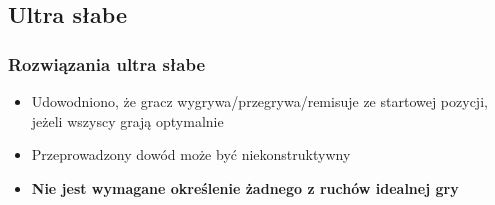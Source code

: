 \documentclass[polish,envcountsect,10pt]{beamer}
\begin{document}
        \subsection{Ultra słabe}
            \begin{frame}
                \frametitle{Rozwiązania ultra słabe}
                \begin{itemize}
                    \item<1-> Udowodniono, że gracz wygrywa/przegrywa/remisuje ze startowej pozycji, jeżeli wszyscy grają optymalnie
                    \item<2-> Przeprowadzony dowód może być niekonstruktywny
                    \item<3-> \textbf{Nie jest wymagane określenie żadnego z ruchów idealnej gry}
                \end{itemize}
            \end{frame}
\end{document}
